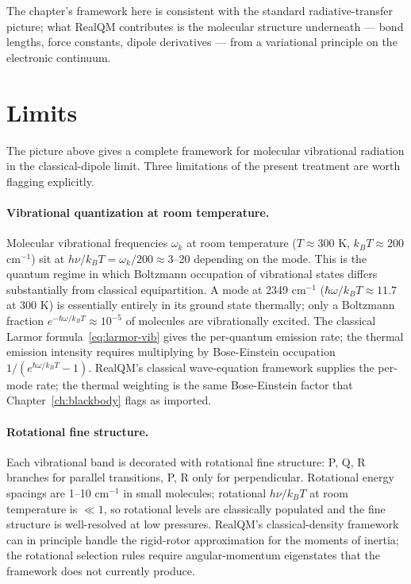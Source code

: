 The chapter's framework here is consistent with the standard radiative-transfer picture; what RealQM contributes is the molecular structure underneath --- bond lengths, force constants, dipole derivatives --- from a variational principle on the electronic continuum.

\section{Limits}\label{sec:molrad-limits}

The picture above gives a complete framework for molecular vibrational radiation in the classical-dipole limit. Three limitations of the present treatment are worth flagging explicitly.

\paragraph{Vibrational quantization at room temperature.}
Molecular vibrational frequencies $\omega_k$ at room temperature ($T \approx 300$ K, $k_B T \approx 200$ cm$^{-1}$) sit at $h\nu / k_B T = \omega_k / 200 \approx 3$--20 depending on the mode. This is the quantum regime in which Boltzmann occupation of vibrational states differs substantially from classical equipartition. A mode at 2349 cm$^{-1}$ ($\hbar\omega/k_B T \approx 11.7$ at 300 K) is essentially entirely in its ground state thermally; only a Boltzmann fraction $e^{-\hbar\omega/k_B T} \approx 10^{-5}$ of molecules are vibrationally excited. The classical Larmor formula~\eqref{eq:larmor-vib} gives the per-quantum emission rate; the thermal emission intensity requires multiplying by Bose-Einstein occupation $1/(e^{\hbar\omega/k_B T} - 1)$. RealQM's classical wave-equation framework supplies the per-mode rate; the thermal weighting is the same Bose-Einstein factor that Chapter~\ref{ch:blackbody} flags as imported.

\paragraph{Rotational fine structure.}
Each vibrational band is decorated with rotational fine structure: P, Q, R branches for parallel transitions, P, R only for perpendicular. Rotational energy spacings are 1--10 cm$^{-1}$ in small molecules; rotational $h\nu/k_B T$ at room temperature is $\ll 1$, so rotational levels are classically populated and the fine structure is well-resolved at low pressures. RealQM's classical-density framework can in principle handle the rigid-rotor approximation for the moments of inertia; the rotational selection rules require angular-momentum eigenstates that the framework does not currently produce.

